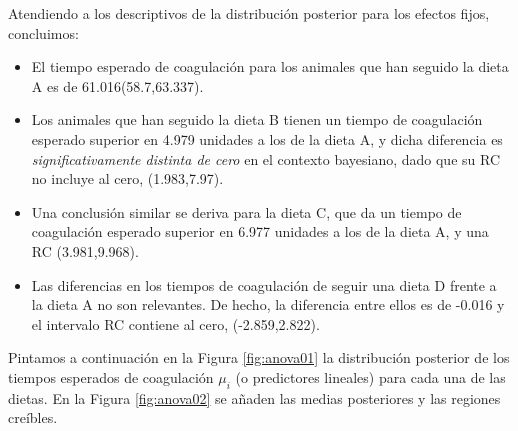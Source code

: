 \documentclass[
]{book}
\providecommand{\tightlist}{%
  \setlength{\itemsep}{0pt}\setlength{\parskip}{0pt}}
\begin{document}
Atendiendo a los descriptivos de la distribución posterior para los efectos fijos, concluimos:

\begin{itemize}
\tightlist
\item
  El tiempo esperado de coagulación para los animales que han seguido la dieta A es de 61.016(58.7,63.337).
\item
  Los animales que han seguido la dieta B tienen un tiempo de coagulación esperado superior en 4.979 unidades a los de la dieta A, y dicha diferencia es \emph{significativamente distinta de cero} en el contexto bayesiano, dado que su RC no incluye al cero, (1.983,7.97).
\item
  Una conclusión similar se deriva para la dieta C, que da un tiempo de coagulación esperado superior en 6.977 unidades a los de la dieta A, y una RC (3.981,9.968).
\item
  Las diferencias en los tiempos de coagulación de seguir una dieta D frente a la dieta A no son relevantes. De hecho, la diferencia entre ellos es de -0.016 y el intervalo RC contiene al cero, (-2.859,2.822).
\end{itemize}

Pintamos a continuación en la Figura \ref{fig:anova01} la distribución posterior de los tiempos esperados de coagulación \(\mu_i\) (o predictores lineales) para cada una de las dietas. En la Figura \ref{fig:anova02} se añaden las medias posteriores y las regiones creíbles.
\end{document}
